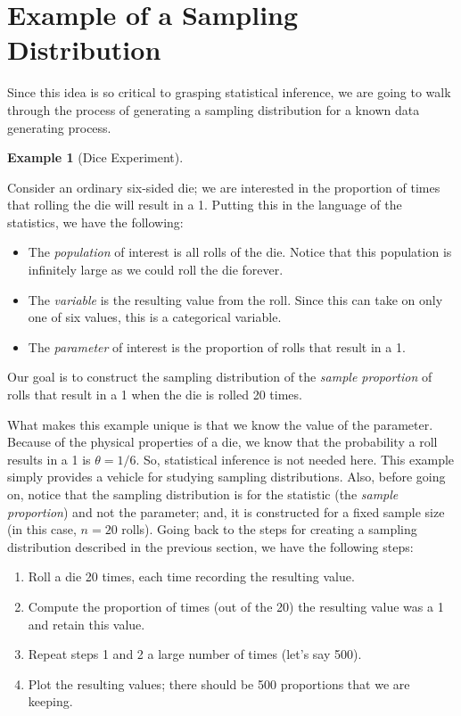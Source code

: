 \documentclass[
  letterpaper,
  DIV=11,
  numbers=noendperiod]{scrreprt}
\providecommand{\tightlist}{%
  \setlength{\itemsep}{0pt}\setlength{\parskip}{0pt}}\usepackage{longtable,booktabs,array}
\theoremstyle{definition}
\theoremstyle{definition}
\newtheorem{example}{Example}[chapter]
\theoremstyle{plain}
\theoremstyle{remark}
\begin{document}
\section{Example of a Sampling
Distribution}\label{example-of-a-sampling-distribution}

Since this idea is so critical to grasping statistical inference, we are
going to walk through the process of generating a sampling distribution
for a known data generating process.

\begin{example}[Dice
Experiment]\protect\hypertarget{exm-samplingdistns-dice}{}\label{exm-samplingdistns-dice}

Consider an ordinary six-sided die; we are interested in the proportion
of times that rolling the die will result in a 1. Putting this in the
language of the statistics, we have the following:

\begin{itemize}
\tightlist
\item
  The \emph{population} of interest is all rolls of the die. Notice that
  this population is infinitely large as we could roll the die forever.
\item
  The \emph{variable} is the resulting value from the roll. Since this
  can take on only one of six values, this is a categorical variable.
\item
  The \emph{parameter} of interest is the proportion of rolls that
  result in a 1.
\end{itemize}

Our goal is to construct the sampling distribution of the \emph{sample
proportion} of rolls that result in a 1 when the die is rolled 20 times.

\end{example}

What makes this example unique is that we know the value of the
parameter. Because of the physical properties of a die, we know that the
probability a roll results in a 1 is \(\theta = 1/6\). So, statistical
inference is not needed here. This example simply provides a vehicle for
studying sampling distributions. Also, before going on, notice that the
sampling distribution is for the statistic (the \emph{sample
proportion}) and not the parameter; and, it is constructed for a fixed
sample size (in this case, \(n = 20\) rolls). Going back to the steps
for creating a sampling distribution described in the previous section,
we have the following steps:

\begin{enumerate}
\def\labelenumi{\arabic{enumi}.}
\tightlist
\item
  Roll a die 20 times, each time recording the resulting value.
\item
  Compute the proportion of times (out of the 20) the resulting value
  was a 1 and retain this value.
\item
  Repeat steps 1 and 2 a large number of times (let's say 500).
\item
  Plot the resulting values; there should be 500 proportions that we are
  keeping.
\end{enumerate}
\end{document}
